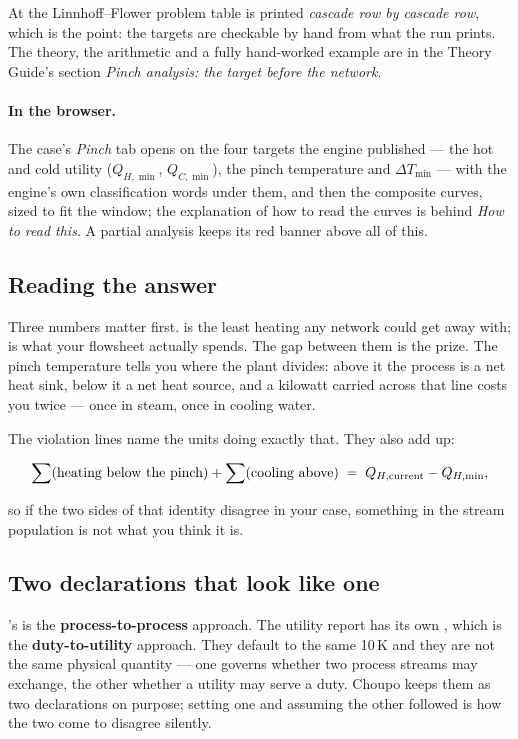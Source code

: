 \documentclass[11pt,a4paper]{article}
\begin{document}
\noindent At  the Linnhoff--Flower problem table is
printed \emph{cascade row by cascade row}, which is the point: the targets
are checkable by hand from what the run prints.  The theory, the
arithmetic and a fully hand-worked example are in the Theory Guide's section \emph{Pinch analysis: the target before
the network}.

\paragraph{In the browser.}  The case's \emph{Pinch} tab opens on the four
targets the engine published --- the hot and cold utility ($Q_{H,\min}$,
$Q_{C,\min}$), the pinch temperature and $\Delta T_{\min}$ --- with the
engine's own classification words under them, and then the composite curves,
sized to fit the window; the explanation of how to read the curves is behind
\emph{How to read this}.  A partial analysis keeps its red banner above all of
this.

\subsection{Reading the answer}

Three numbers matter first.   is the least heating any
network could get away with;  is what your
flowsheet actually spends.  The gap between them is the prize.  The pinch
temperature tells you where the plant divides: above it the process is a
net heat sink, below it a net heat source, and a kilowatt carried across
that line costs you twice --- once in steam, once in cooling water.

The violation lines name the units doing exactly that.  They also add up:

\[
\sum(\text{heating below the pinch}) + \sum(\text{cooling above})
\;=\; Q_{H,\rm current} - Q_{H,\min},
\]

so if the two sides of that identity disagree in your case, something in
the stream population is not what you think it is.

\subsection{Two declarations that look like one}

\begin{pitfall}
's  is the \textbf{process-to-process}
approach.  The utility report has its own , which is the
\textbf{duty-to-utility} approach.  They default to the same 10\,K and
they are not the same physical quantity --- one governs whether two
process streams may exchange, the other whether a utility may serve a
duty.  Choupo keeps them as two declarations on purpose; setting one and
assuming the other followed is how the two come to disagree silently.
\end{pitfall}
\end{document}
